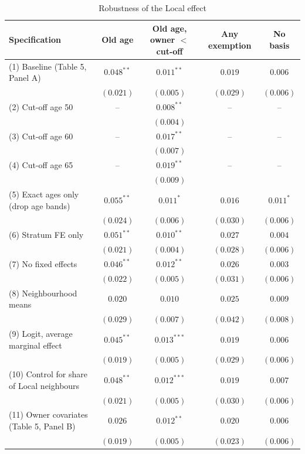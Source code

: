 \begin{table}[!htbp]\centering\scriptsize
\caption{Robustness of the Local effect}\label{tab:robust}
\begin{threeparttable}
\begin{tabular}{lcccc}
\toprule
Specification & Old age & Old age, owner $<$ cut-off & Any exemption & No basis \\
\midrule
(1) Baseline (Table 5, Panel A) & $0.048^{**}$ & $0.011^{**}$ & $0.019$ & $0.006$ \\
 & $(0.021)$ & $(0.005)$ & $(0.029)$ & $(0.006)$ \\
(2) Cut-off age 50 & -- & $0.008^{**}$ & -- & -- \\
 &  & $(0.004)$ &  &  \\
(3) Cut-off age 60 & -- & $0.017^{**}$ & -- & -- \\
 &  & $(0.007)$ &  &  \\
(4) Cut-off age 65 & -- & $0.019^{**}$ & -- & -- \\
 &  & $(0.009)$ &  &  \\
(5) Exact ages only (drop age bands) & $0.055^{**}$ & $0.011^{*}$ & $0.016$ & $0.011^{*}$ \\
 & $(0.024)$ & $(0.006)$ & $(0.030)$ & $(0.006)$ \\
(6) Stratum FE only & $0.051^{**}$ & $0.010^{**}$ & $0.027$ & $0.004$ \\
 & $(0.021)$ & $(0.004)$ & $(0.028)$ & $(0.006)$ \\
(7) No fixed effects & $0.046^{**}$ & $0.012^{**}$ & $0.026$ & $0.003$ \\
 & $(0.022)$ & $(0.005)$ & $(0.031)$ & $(0.006)$ \\
(8) Neighbourhood means & $0.020$ & $0.010$ & $0.025$ & $0.009$ \\
 & $(0.029)$ & $(0.007)$ & $(0.042)$ & $(0.008)$ \\
(9) Logit, average marginal effect & $0.045^{**}$ & $0.013^{***}$ & $0.019$ & $0.006$ \\
 & $(0.019)$ & $(0.005)$ & $(0.029)$ & $(0.006)$ \\
(10) Control for share of Local neighbours & $0.048^{**}$ & $0.012^{***}$ & $0.019$ & $0.007$ \\
 & $(0.021)$ & $(0.005)$ & $(0.030)$ & $(0.006)$ \\
(11) Owner covariates (Table 5, Panel B) & $0.026$ & $0.012^{**}$ & $0.020$ & $0.006$ \\
 & $(0.019)$ & $(0.005)$ & $(0.023)$ & $(0.006)$ \\

\end{tabular}
\end{threeparttable}
\end{table}
